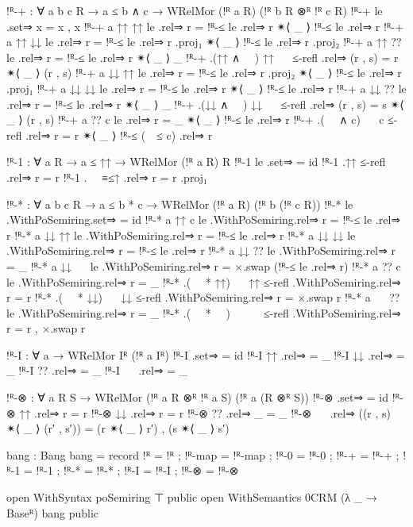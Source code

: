 \begin{code}
    !ᴿ-+ : ∀ {a b c R} → a ≤ b ∧ c → WRelMor (!ᴿ a R) (!ᴿ b R ⊗ᴿ !ᴿ c R)
    !ᴿ-+ le .set⇒ x = x , x
    !ᴿ-+ {a} {↑↑} {↑↑} le .rel⇒ r = !ᴿ-≤ le .rel⇒ r ✴⟨ _ ⟩ !ᴿ-≤ le .rel⇒ r
    !ᴿ-+ {a} {↑↑} {↓↓} le .rel⇒ r =
      !ᴿ-≤ le .rel⇒ r .proj₁ ✴⟨ _ ⟩ !ᴿ-≤ le .rel⇒ r .proj₂
    !ᴿ-+ {a} {↑↑} {??} le .rel⇒ r = !ᴿ-≤ le .rel⇒ r ✴⟨ _ ⟩ _
    !ᴿ-+ {.(↑↑ ∧ ~~)} {↑↑} {~~} ≤-refl .rel⇒ (r , s) = r ✴⟨ _ ⟩ (r , s)
    !ᴿ-+ {a} {↓↓} {↑↑} le .rel⇒ r =
      !ᴿ-≤ le .rel⇒ r .proj₂ ✴⟨ _ ⟩ !ᴿ-≤ le .rel⇒ r .proj₁
    !ᴿ-+ {a} {↓↓} {↓↓} le .rel⇒ r = !ᴿ-≤ le .rel⇒ r ✴⟨ _ ⟩ !ᴿ-≤ le .rel⇒ r
    !ᴿ-+ {a} {↓↓} {??} le .rel⇒ r = !ᴿ-≤ le .rel⇒ r ✴⟨ _ ⟩ _
    !ᴿ-+ {.(↓↓ ∧ ~~)} {↓↓} {~~} ≤-refl .rel⇒ (r , s) = s ✴⟨ _ ⟩ (r , s)
    !ᴿ-+ {a} {??} {c} le .rel⇒ r = _ ✴⟨ _ ⟩ !ᴿ-≤ le .rel⇒ r
    !ᴿ-+ {.(~~ ∧ c)} {~~} {c} ≤-refl .rel⇒ r = r ✴⟨ _ ⟩ !ᴿ-≤ (~~≤ {c}) .rel⇒ r

    !ᴿ-1 : ∀ {a R} → a ≤ ↑↑ → WRelMor (!ᴿ a R) R
    !ᴿ-1 le .set⇒ = id
    !ᴿ-1 {.↑↑} ≤-refl .rel⇒ r = r
    !ᴿ-1 {.~~} ≡≤↑ .rel⇒ r = r .proj₁

    !ᴿ-* : ∀ {a b c R} → a ≤ b * c → WRelMor (!ᴿ a R) (!ᴿ b (!ᴿ c R))
    !ᴿ-* le .WithPoSemiring.set⇒ = id
    !ᴿ-* {a} {↑↑} {c} le .WithPoSemiring.rel⇒ r = !ᴿ-≤ le .rel⇒ r
    !ᴿ-* {a} {↓↓} {↑↑} le .WithPoSemiring.rel⇒ r = !ᴿ-≤ le .rel⇒ r
    !ᴿ-* {a} {↓↓} {↓↓} le .WithPoSemiring.rel⇒ r = !ᴿ-≤ le .rel⇒ r
    !ᴿ-* {a} {↓↓} {??} le .WithPoSemiring.rel⇒ r = _
    !ᴿ-* {a} {↓↓} {~~} le .WithPoSemiring.rel⇒ r = ×.swap (!ᴿ-≤ le .rel⇒ r)
    !ᴿ-* {a} {??} {c} le .WithPoSemiring.rel⇒ r = _
    !ᴿ-* {.(~~ * ↑↑)} {~~} {↑↑} ≤-refl .WithPoSemiring.rel⇒ r = r
    !ᴿ-* {.(~~ * ↓↓)} {~~} {↓↓} ≤-refl .WithPoSemiring.rel⇒ r = ×.swap r
    !ᴿ-* {a} {~~} {??} le .WithPoSemiring.rel⇒ r = _
    !ᴿ-* {.(~~ * ~~)} {~~} {~~} ≤-refl .WithPoSemiring.rel⇒ r = r , ×.swap r

    !ᴿ-I : ∀ {a} → WRelMor Iᴿ (!ᴿ a Iᴿ)
    !ᴿ-I .set⇒ = id
    !ᴿ-I {↑↑} .rel⇒ = _
    !ᴿ-I {↓↓} .rel⇒ = _
    !ᴿ-I {??} .rel⇒ = _
    !ᴿ-I {~~} .rel⇒ = _

    !ᴿ-⊗ : ∀ {a R S} → WRelMor (!ᴿ a R ⊗ᴿ !ᴿ a S) (!ᴿ a (R ⊗ᴿ S))
    !ᴿ-⊗ .set⇒ = id
    !ᴿ-⊗ {↑↑} .rel⇒ r = r
    !ᴿ-⊗ {↓↓} .rel⇒ r = r
    !ᴿ-⊗ {??} .rel⇒ _ = _
    !ᴿ-⊗ {~~} .rel⇒ ((r , s) ✴⟨ _ ⟩ (r′ , s′)) = (r ✴⟨ _ ⟩ r′) , (s ✴⟨ _ ⟩ s′)

    bang : Bang
    bang = record
      { !ᴿ = !ᴿ
      ; !ᴿ-map = !ᴿ-map
      ; !ᴿ-0 = !ᴿ-0
      ; !ᴿ-+ = !ᴿ-+
      ; !ᴿ-1 = !ᴿ-1
      ; !ᴿ-* = !ᴿ-*
      ; !ᴿ-I = !ᴿ-I
      ; !ᴿ-⊗ = !ᴿ-⊗
      }

    open WithSyntax poSemiring ⊤ public
    open WithSemantics 0CRM (λ _ → Baseᴿ) bang public


\end{code}
